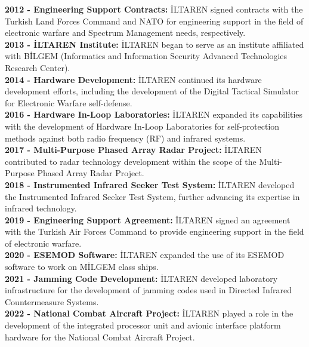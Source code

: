 \documentclass[12pt]{report}
\begin{document}
        \textbf{2012 - Engineering Support Contracts:} İLTAREN signed contracts with the Turkish Land Forces Command and NATO for engineering support in the field of electronic warfare and Spectrum Management needs, respectively.
        \\ \newline
        \textbf{2013 - İLTAREN Institute:} İLTAREN began to serve as an institute affiliated with BİLGEM (Informatics and Information Security Advanced Technologies Research Center).
        \\ \newline
        \textbf{2014 - Hardware Development:} İLTAREN continued its hardware development efforts, including the development of the Digital Tactical Simulator for Electronic Warfare self-defense.
        \\ \newline
        \textbf{2016 - Hardware In-Loop Laboratories:} İLTAREN expanded its capabilities with the development of Hardware In-Loop Laboratories for self-protection methods against both radio frequency (RF) and infrared systems.
        \\ \newline
        \textbf{2017 - Multi-Purpose Phased Array Radar Project:} İLTAREN contributed to radar technology development within the scope of the Multi-Purpose Phased Array Radar Project.
        \\ \newline
        \textbf{2018 - Instrumented Infrared Seeker Test System:} İLTAREN developed the Instrumented Infrared Seeker Test System, further advancing its expertise in infrared technology.
        \\ \newline
        \textbf{2019 - Engineering Support Agreement:} İLTAREN signed an agreement with the Turkish Air Forces Command to provide engineering support in the field of electronic warfare.
        \\ \newline
        \textbf{2020 - ESEMOD Software:} İLTAREN expanded the use of its ESEMOD software to work on MİLGEM class ships.
        \\ \newline
        \textbf{2021 - Jamming Code Development:} İLTAREN developed laboratory infrastructure for the development of jamming codes used in Directed Infrared Countermeasure Systems.
        \\ \newline
        \textbf{2022 - National Combat Aircraft Project:} İLTAREN played a role in the development of the integrated processor unit and avionic interface platform hardware for the National Combat Aircraft Project.
\end{document}
